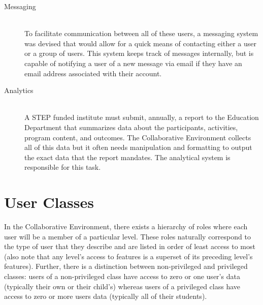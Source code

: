 \begin{description}
	\item [Messaging] \hfill \\ To facilitate communication between all of these users, a messaging system was devised that would allow for a quick means of contacting either a user or a group of users. This system keeps track of messages internally, but is capable of notifying a user of a new message via email if they have an email address associated with their account.
	\item [Analytics] \hfill \\ A STEP funded institute must submit, annually, a report to the Education Department that summarizes data about the participants, activities, program content, and outcomes. The Collaborative Environment collects all of this data but it often needs manipulation and formatting to output the exact data that the report mandates. The analytical system is responsible for this task.
\end{description}

\section{User Classes}
\label{sec:overview-user-classes}

In the Collaborative Environment, there exists a hierarchy of roles where each user will be a member of a particular level. These roles naturally correspond to the type of user that they describe and are listed in order of least access to most (also note that any level's access to features is a superset of its preceding level's features). Further, there is a distinction between non-privileged and privileged classes: users of a non-privileged class have access to zero or one user's data (typically their own or their child's) whereas users of a privileged class have access to zero or more users data (typically all of their students).

